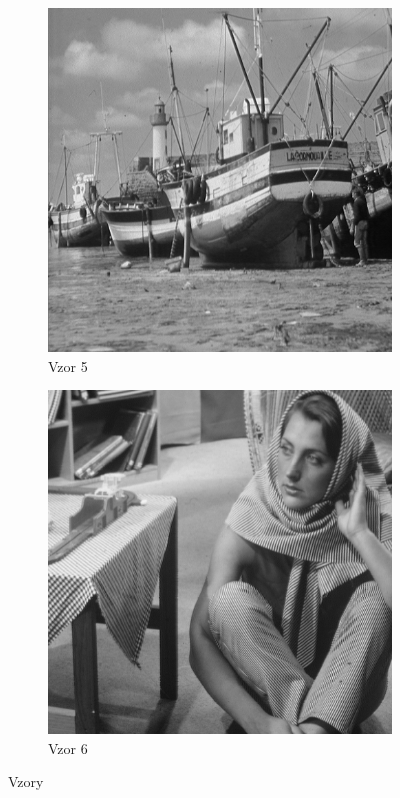 \documentclass[a4paper,11pt]{scrartcl}
\begin{document}
\begin{figure}[!h]
\begin{subfigure}[b]{0.4\textwidth}
    \end{subfigure}
    \begin{subfigure}[b]{0.4\textwidth}
        \includegraphics[width=\textwidth]{img/example5.png}
        \caption{Vzor 5}
        \label{fig:gull}
    \end{subfigure}
    \begin{subfigure}[b]{0.4\textwidth}
        \includegraphics[width=\textwidth]{img/example6.png}
        \caption{Vzor 6}
        \label{fig:gull}
    \end{subfigure}
    \caption{Vzory}
    \label{vzory}    
\end{figure}
\end{document}
